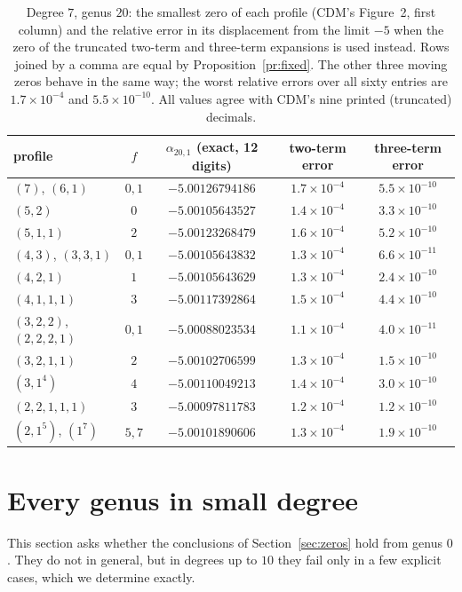 \documentclass[11pt,a4paper]{article}
\theoremstyle{definition}\newtheorem{definition}[theorem]{Definition}
\theoremstyle{remark}\newtheorem{remark}[theorem]{Remark}\newtheorem{example}[theorem]{Example}
\numberwithin{equation}{section}
\begin{document}
\begin{table}[ht]
\centering\small
\begin{tabular}{lcccc}
\toprule
profile & $f$ & $\alpha_{20,1}$ (exact, 12 digits) & two-term error & three-term error\\
\midrule
$(7)$, $(6,1)$ & $0,1$ & $-5.00126794186$ & $1.7\times10^{-4}$ & $5.5\times10^{-10}$\\
$(5,2)$ & $0$ & $-5.00105643527$ & $1.4\times10^{-4}$ & $3.3\times10^{-10}$\\
$(5,1,1)$ & $2$ & $-5.00123268479$ & $1.6\times10^{-4}$ & $5.2\times10^{-10}$\\
$(4,3)$, $(3,3,1)$ & $0,1$ & $-5.00105643832$ & $1.3\times10^{-4}$ & $6.6\times10^{-11}$\\
$(4,2,1)$ & $1$ & $-5.00105643629$ & $1.3\times10^{-4}$ & $2.4\times10^{-10}$\\
$(4,1,1,1)$ & $3$ & $-5.00117392864$ & $1.5\times10^{-4}$ & $4.4\times10^{-10}$\\
$(3,2,2)$, $(2,2,2,1)$ & $0,1$ & $-5.00088023534$ & $1.1\times10^{-4}$ & $4.0\times10^{-11}$\\
$(3,2,1,1)$ & $2$ & $-5.00102706599$ & $1.3\times10^{-4}$ & $1.5\times10^{-10}$\\
$(3,1^4)$ & $4$ & $-5.00110049213$ & $1.4\times10^{-4}$ & $3.0\times10^{-10}$\\
$(2,2,1,1,1)$ & $3$ & $-5.00097811783$ & $1.2\times10^{-4}$ & $1.2\times10^{-10}$\\
$(2,1^5)$, $(1^7)$ & $5,7$ & $-5.00101890606$ & $1.3\times10^{-4}$ & $1.9\times10^{-10}$\\
\bottomrule
\end{tabular}
\caption{Degree $7$, genus $20$: the smallest zero of each profile (CDM's Figure~2, first column) and the relative error in its displacement from the limit $-5$ when the zero of the truncated two-term and three-term expansions is used instead. Rows joined by a comma are equal by Proposition~\ref{pr:fixed}. The other three moving zeros behave in the same way; the worst relative errors over all sixty entries are $1.7\times10^{-4}$ and $5.5\times10^{-10}$. All values agree with CDM's nine printed (truncated) decimals.}\label{tab:fig2}
\end{table}

\section{Every genus in small degree}\label{sec:small}
This section asks whether the conclusions of Section~\ref{sec:zeros} hold from genus $0$. They do not in general, but in degrees up to $10$ they fail only in a few explicit cases, which we determine exactly.
\end{document}

